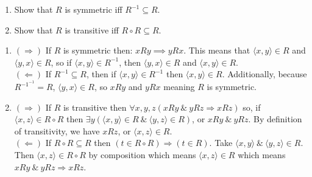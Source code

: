 \documentclass[12pt,letterpaper,boxed]{hmcpset}
\begin{document}

\begin{problem}[3.32]
  \begin{enumerate}
    \item Show that $R$ is symmetric iff $R^{-1} \subseteq R$.
    \item Show that $R$ is transitive iff $R \circ R \subseteq R$.
  \end{enumerate}
\end{problem}
\begin{solution}
  \begin{enumerate}
    \item $(\Rightarrow)$ If $R$ is symmetric then: $xRy \implies yRx$. This means that $\langle x,y\rangle \in R$ and $\langle y,x\rangle \in R$, so if $\langle x,y\rangle \in R^{-1}$, then $\langle y,x\rangle \in R$ and $\langle x,y\rangle \in R$. \\
      $(\Leftarrow)$ If $R^{-1} \subseteq R$, then if $\langle x,y\rangle \in R^{-1}$ then $\langle x,y\rangle \in R$. Additionally, because $R^{-1^{-1}} = R$, $\langle y,x\rangle \in R$, so $xRy$ and $yRx$ meaning $R$ is symmetric.
    \item $(\Rightarrow)$ If $R$ is transitive then $\forall x,y,z (xRy \:\&\:yRz \Rightarrow xRz)$ so, if $\langle x,z\rangle \in R\circ R$ then $\exists y (\langle x,y\rangle \in R \:\&\: \langle y,z\rangle \in R)$, or $xRy\:\&\: yRz$. By definition of transitivity, we have $xRz$, or $\langle x,z\rangle \in R$. \\
    $(\Leftarrow)$ If $R\circ R \subseteq R$ then $(t \in R\circ R) \Rightarrow (t \in R)$. Take $\langle x,y\rangle \:\&\: \langle y,z\rangle \in R$. Then $\langle x,z\rangle \in R\circ R$ by composition which means $\langle x,z\rangle \in R$ which means $xRy \:\&\: yRz \Rightarrow xRz$.
  \end{enumerate}
\end{solution}
\end{document}
